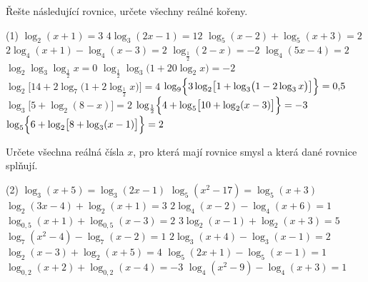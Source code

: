 \begin{exercise}
    Řešte následující rovnice, určete všechny reálné kořeny.
    \begin{tasks}(1)
        \task $\log_{2}(x+1) = 3$
        \task $4\log_{3}(2x-1) = 12$
        \task $\log_{5}(x-2) + \log_{5}(x+3) = 2$
        \task $2\log_{4}(x+1) - \log_{4}(x-3) = 2$
        \task $\log_{\frac12}(2-x) = -2$
        \task $\log_{4}(5x-4) = 2$
        \task $\log_{2}\log_{3}\log_{\frac12} x = 0$
        \task $\log_{\frac12}\log_{3}\bigl(1 + 20\log_{2} x\bigr) = -2$
        \task $\log_{2}\bigl[14 + 2\log_{7}\bigl(1 + 2\log_{\frac12} x\bigr)\bigr] = 4$
        \task $\log_{9}\Bigl\{3\log_{2}\bigl[1 + \log_{3}\bigl(1 - 2\log_{3} x\bigr)\bigr]\Bigr\} = 0{,}5$
        \task $\log_{3}\bigl[5 + \log_{2}(8 - x)\bigr] = 2$
        \task $\log_{\frac12}\Bigl\{4 + \log_{5}\bigl[10 + \log_{2}(x - 3)\bigr]\Bigr\} = -3$
        \task $\log_{5}\Bigl\{6 + \log_{2}\bigl[8 + \log_{3}(x - 1)\bigr]\Bigr\} = 2$
    \end{tasks}
\end{exercise}


\begin{exercise}
    Určete všechna reálná čísla $x$, pro která mají rovnice smysl a která dané rovnice splňují.
    \begin{tasks}(2)
        \task $\log_3(x+5) = \log_3(2x-1)$
        \task $\log_5(x^2 - 17) = \log_5(x+3)$
        \task $\log_2(3x - 4) + \log_2(x + 1) = 3$
        \task $2\log_4(x - 2) - \log_4(x + 6) = 1$
        \task $\log_{0{,}5}(x + 1) + \log_{0{,}5}(x - 3) = 2$
        \task $3\log_2(x - 1) + \log_2(x + 3) = 5$
        \task $\log_7(x^2 - 4) - \log_7(x - 2) = 1$
        \task $2\log_3(x + 4) - \log_3(x - 1) = 2$
        \task $\log_{2}(x - 3) + \log_{2}(x + 5) = 4$
        \task $ \log_{5}(2x + 1) - \log_{5}(x - 1) = 1$
        \task $\log_{0{,}2}(x + 2) + \log_{0{,}2}(x - 4) = -3$
        \task $ \log_{4}(x^2 - 9) - \log_{4}(x + 3) = 1$
    \end{tasks}
\end{exercise}


